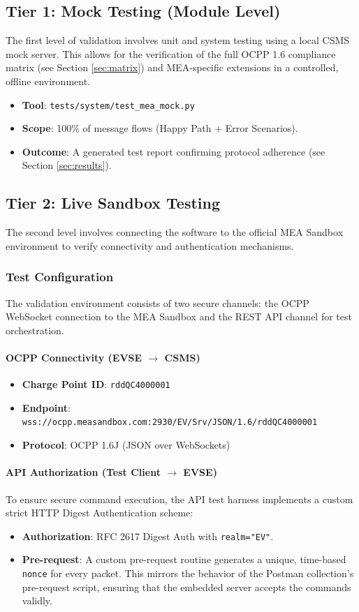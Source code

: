\documentclass[a4paper,11pt]{report}
\begin{document}
\subsection{Tier 1: Mock Testing (Module Level)}
The first level of validation involves unit and system testing using a local CSMS mock server. This allows for the verification of the full OCPP 1.6 compliance matrix (see Section \ref{sec:matrix}) and MEA-specific extensions in a controlled, offline environment.
\begin{itemize}
    \item \textbf{Tool}: \texttt{tests/system/test\_mea\_mock.py}
    \item \textbf{Scope}: 100\% of message flows (Happy Path + Error Scenarios).
    \item \textbf{Outcome}: A generated test report confirming protocol adherence (see Section \ref{sec:results}).
\end{itemize}

\subsection{Tier 2: Live Sandbox Testing}
The second level involves connecting the software to the official MEA Sandbox environment to verify connectivity and authentication mechanisms.

\subsubsection{Test Configuration}
The validation environment consists of two secure channels: the OCPP WebSocket connection to the MEA Sandbox and the REST API channel for test orchestration.

\paragraph{OCPP Connectivity (EVSE $\to$ CSMS)}
\begin{itemize}
    \item \textbf{Charge Point ID}: \texttt{rddQC4000001}
    \item \textbf{Endpoint}: \texttt{wss://ocpp.measandbox.com:2930/EV/Srv/JSON/1.6/rddQC4000001}
    \item \textbf{Protocol}: OCPP 1.6J (JSON over WebSockets)
\end{itemize}

\paragraph{API Authorization (Test Client $\to$ EVSE)}
To ensure secure command execution, the API test harness implements a custom strict HTTP Digest Authentication scheme:
\begin{itemize}
    \item \textbf{Authorization}: RFC 2617 Digest Auth with \texttt{realm="EV"}.
    \item \textbf{Pre-request}: A custom pre-request routine generates a unique, time-based \texttt{nonce} for every packet. This mirrors the behavior of the Postman collection's pre-request script, ensuring that the embedded server accepts the commands validly.
\end{itemize}
\end{document}
